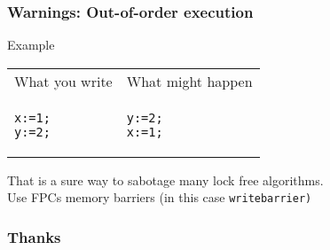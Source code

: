 \documentclass{beamer}
\begin{document}
\begin{frame}[fragile]
\frametitle{Warnings: Out-of-order execution}
\begin{center}
Example
\end{center}
\begin{tabular}{p{5.7cm} p{5.7cm}}
What you write
&
What might happen\\
\begin{verbatim}
x:=1;
y:=2;
\end{verbatim}
&
\begin{verbatim}
y:=2;
x:=1;
\end{verbatim}
\end{tabular}
\begin{center}
That is a sure way to sabotage many lock free algorithms.\\
Use FPCs memory barriers (in this case \tt{writebarrier})
\end{center}
\end{frame}

\begin{frame}
\frametitle{Thanks}
\end{frame}
\end{document}
